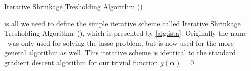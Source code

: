 \begin{algorithm}
 \caption{Iterative Shrinkage Tresholding Algorithm (\ista)~\cite{fista}}\label{alg:ista} 
 \begin{algorithmic}[1]
    \Statex
     
      \EndWhile
     \State \Return{\(\bm{\alpha}\)}
    \EndFunction
\end{algorithmic}
\end{algorithm}

 is all we need to define the simple iterative scheme called
Iterative Shrinkage Tresholding Algorithm~(\ista), which is presented by \cref{alg:ista}.
Originally the name \ista\ was only used for solving the lasso problem, but is now used for the more general algorithm as well. 
This iterative scheme is identical to the standard gradient descent algorithm for our trivial function \(g(\bm{\alpha}) = 0\).

